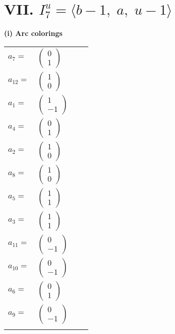 \documentclass[1p]{elsarticle_modified}
\theoremstyle{definition}
\begin{document}
\centering \section*{VII. $I^u_{7}= \langle b-1,\;a,\;u-1 \rangle$}
\flushleft \textbf{(i) Arc colorings}\\
\begin{tabular}{m{7pt} m{180pt} m{7pt} m{180pt} }
\flushright $a_{7}=$&$\begin{pmatrix}0\\1\end{pmatrix}$ \\
\flushright $a_{12}=$&$\begin{pmatrix}1\\0\end{pmatrix}$ \\
\flushright $a_{1}=$&$\begin{pmatrix}1\\-1\end{pmatrix}$ \\
\flushright $a_{4}=$&$\begin{pmatrix}0\\1\end{pmatrix}$ \\
\flushright $a_{2}=$&$\begin{pmatrix}1\\0\end{pmatrix}$ \\
\flushright $a_{8}=$&$\begin{pmatrix}1\\0\end{pmatrix}$ \\
\flushright $a_{5}=$&$\begin{pmatrix}1\\1\end{pmatrix}$ \\
\flushright $a_{3}=$&$\begin{pmatrix}1\\1\end{pmatrix}$ \\
\flushright $a_{11}=$&$\begin{pmatrix}0\\-1\end{pmatrix}$ \\
\flushright $a_{10}=$&$\begin{pmatrix}0\\-1\end{pmatrix}$ \\
\flushright $a_{6}=$&$\begin{pmatrix}0\\1\end{pmatrix}$ \\
\flushright $a_{9}=$&$\begin{pmatrix}0\\-1\end{pmatrix}$\\&\end{tabular}
\end{document}
